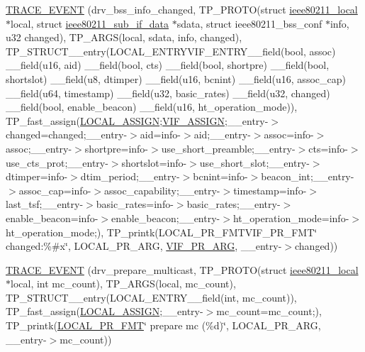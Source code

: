 \begin{DoxyCompactItemize}
\hyperlink{driver-trace_8h_aa4c84623c0a4ec38ce4781da7df644cd}{T\-R\-A\-C\-E\-\_\-\-E\-V\-E\-N\-T} (drv\-\_\-bss\-\_\-info\-\_\-changed, T\-P\-\_\-\-P\-R\-O\-T\-O(struct \hyperlink{structieee80211__local}{ieee80211\-\_\-local} $\ast$local, struct \hyperlink{structieee80211__sub__if__data}{ieee80211\-\_\-sub\-\_\-if\-\_\-data} $\ast$sdata, struct ieee80211\-\_\-bss\-\_\-conf $\ast$info, u32 changed), T\-P\-\_\-\-A\-R\-G\-S(local, sdata, info, changed), T\-P\-\_\-\-S\-T\-R\-U\-C\-T\-\_\-\-\_\-entry(L\-O\-C\-A\-L\-\_\-\-E\-N\-T\-R\-Y\-V\-I\-F\-\_\-\-E\-N\-T\-R\-Y\-\_\-\-\_\-field(bool, assoc) \-\_\-\-\_\-field(u16, aid) \-\_\-\-\_\-field(bool, cts) \-\_\-\-\_\-field(bool, shortpre) \-\_\-\-\_\-field(bool, shortslot) \-\_\-\-\_\-field(u8, dtimper) \-\_\-\-\_\-field(u16, bcnint) \-\_\-\-\_\-field(u16, assoc\-\_\-cap) \-\_\-\-\_\-field(u64, timestamp) \-\_\-\-\_\-field(u32, basic\-\_\-rates) \-\_\-\-\_\-field(u32, changed) \-\_\-\-\_\-field(bool, enable\-\_\-beacon) \-\_\-\-\_\-field(u16, ht\-\_\-operation\-\_\-mode)), T\-P\-\_\-fast\-\_\-assign(\hyperlink{driver-trace_8h_ab19d9141887ea92ef9640df06a51e0a1}{L\-O\-C\-A\-L\-\_\-\-A\-S\-S\-I\-G\-N};\hyperlink{driver-trace_8h_af5ede80f04ffcb3f644f68837b1d252c}{V\-I\-F\-\_\-\-A\-S\-S\-I\-G\-N};\-\_\-\-\_\-entry-\/$>$changed=changed;\-\_\-\-\_\-entry-\/$>$aid=info-\/$>$aid;\-\_\-\-\_\-entry-\/$>$assoc=info-\/$>$assoc;\-\_\-\-\_\-entry-\/$>$shortpre=info-\/$>$use\-\_\-short\-\_\-preamble;\-\_\-\-\_\-entry-\/$>$cts=info-\/$>$use\-\_\-cts\-\_\-prot;\-\_\-\-\_\-entry-\/$>$shortslot=info-\/$>$use\-\_\-short\-\_\-slot;\-\_\-\-\_\-entry-\/$>$dtimper=info-\/$>$dtim\-\_\-period;\-\_\-\-\_\-entry-\/$>$bcnint=info-\/$>$beacon\-\_\-int;\-\_\-\-\_\-entry-\/$>$assoc\-\_\-cap=info-\/$>$assoc\-\_\-capability;\-\_\-\-\_\-entry-\/$>$timestamp=info-\/$>$last\-\_\-tsf;\-\_\-\-\_\-entry-\/$>$basic\-\_\-rates=info-\/$>$basic\-\_\-rates;\-\_\-\-\_\-entry-\/$>$enable\-\_\-beacon=info-\/$>$enable\-\_\-beacon;\-\_\-\-\_\-entry-\/$>$ht\-\_\-operation\-\_\-mode=info-\/$>$ht\-\_\-operation\-\_\-mode;), T\-P\-\_\-printk(L\-O\-C\-A\-L\-\_\-\-P\-R\-\_\-\-F\-M\-T\-V\-I\-F\-\_\-\-P\-R\-\_\-\-F\-M\-T\char`\"{} changed\-:\%\#x\char`\"{}, L\-O\-C\-A\-L\-\_\-\-P\-R\-\_\-\-A\-R\-G, \hyperlink{driver-trace_8h_a12c9f3afcd1c461f7ae2f86fd8503977}{V\-I\-F\-\_\-\-P\-R\-\_\-\-A\-R\-G}, \-\_\-\-\_\-entry-\/$>$changed))
\item 
\hyperlink{driver-trace_8h_abb0d6e229cadfa0fbe54ab6a2655e107}{T\-R\-A\-C\-E\-\_\-\-E\-V\-E\-N\-T} (drv\-\_\-prepare\-\_\-multicast, T\-P\-\_\-\-P\-R\-O\-T\-O(struct \hyperlink{structieee80211__local}{ieee80211\-\_\-local} $\ast$local, int mc\-\_\-count), T\-P\-\_\-\-A\-R\-G\-S(local, mc\-\_\-count), T\-P\-\_\-\-S\-T\-R\-U\-C\-T\-\_\-\-\_\-entry(L\-O\-C\-A\-L\-\_\-\-E\-N\-T\-R\-Y\-\_\-\-\_\-field(int, mc\-\_\-count)), T\-P\-\_\-fast\-\_\-assign(\hyperlink{driver-trace_8h_ab19d9141887ea92ef9640df06a51e0a1}{L\-O\-C\-A\-L\-\_\-\-A\-S\-S\-I\-G\-N};\-\_\-\-\_\-entry-\/$>$mc\-\_\-count=mc\-\_\-count;), T\-P\-\_\-printk(\hyperlink{driver-trace_8h_a09833af423135e21ffe99a59ae088cf1}{L\-O\-C\-A\-L\-\_\-\-P\-R\-\_\-\-F\-M\-T}\char`\"{} prepare mc (\%d)\char`\"{}, L\-O\-C\-A\-L\-\_\-\-P\-R\-\_\-\-A\-R\-G, \-\_\-\-\_\-entry-\/$>$mc\-\_\-count))

\end{DoxyCompactItemize}
